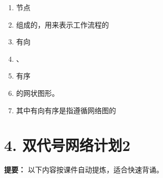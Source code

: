 \documentclass[UTF8,fontset=fandol,11pt]{ctexart}
\begin{document}
\begin{enumerate}[label=\arabic*.]
\item 节点

\item 组成的，用来表示工作流程的

\item 有向

\item 、

\item 有序

\item 的网状图形。

\item 其中有向有序是指遵循网络图的

\end{enumerate}

\newpage

\section*{4. 双代号网络计划2}


\begin{mainbox}

\textbf{提要：} 以下内容按课件自动提炼，适合快速背诵。

\end{mainbox}
\end{document}
